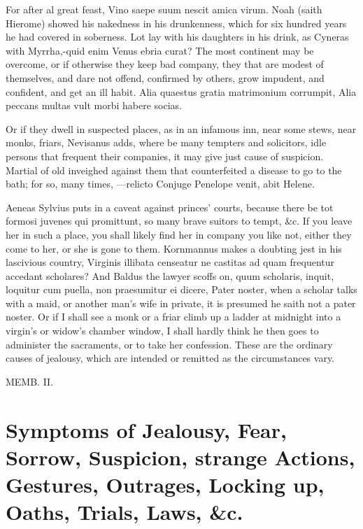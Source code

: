 {For after al great feast, Vino saepe suum nescit amica virum.
Noah (saith Hierome) showed his nakedness in his drunkenness,
which for six hundred years he had covered in soberness. Lot lay with
his daughters in his drink, as Cyneras with Myrrha,-quid enim
Venus ebria curat? The most continent may be overcome, or if otherwise
they keep bad company, they that are modest of themselves, and dare not
offend, confirmed by others, grow impudent, and confident, and
get an ill habit.
Alia quaestus gratia matrimonium corrumpit,
Alia peccans multas vult morbi habere socias.

Or if they dwell in suspected places, as in an infamous inn, near some
stews, near monks, friars, Nevisanus adds, where be many tempters and
solicitors, idle persons that frequent their companies, it may give
just cause of suspicion. Martial of old inveighed against them that
counterfeited a disease to go to the bath; for so, many times,
---relicto
Conjuge Penelope venit, abit Helene.

Aeneas Sylvius puts in a caveat against princes' courts, because there
be tot formosi juvenes qui promittunt, so many brave suitors to tempt,
\&c. If you leave her in such a place, you shall likely find her
in company you like not, either they come to her, or she is gone to
them. Kornmannus makes a doubting jest in his lascivious country,
Virginis illibata censeatur ne castitas ad quam frequentur accedant
scholares? And Baldus the lawyer scoffs on, quum scholaris, inquit,
loquitur cum puella, non praesumitur ei dicere, Pater noster, when a
scholar talks with a maid, or another man's wife in private, it is
presumed he saith not a pater noster. Or if I shall see a monk or a
friar climb up a ladder at midnight into a virgin's or widow's chamber
window, I shall hardly think he then goes to administer the sacraments,
or to take her confession. These are the ordinary causes of jealousy,
which are intended or remitted as the circumstances vary.

MEMB. II.

\section[Symptoms of Jealousy]{Symptoms of Jealousy, Fear, Sorrow, Suspicion, strange Actions, Gestures, Outrages, Locking up, Oaths, Trials, Laws, \&c.}

}
